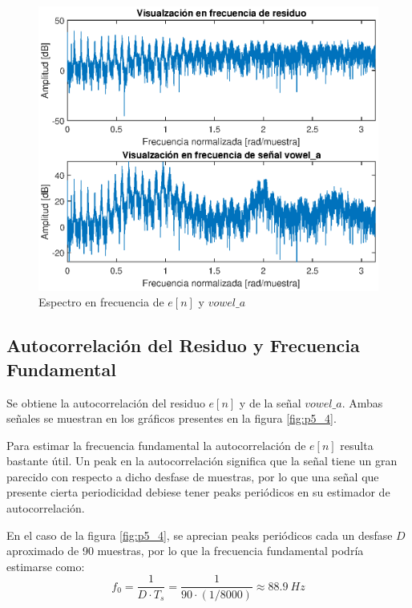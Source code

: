 \begin{figure}[H]
    \centering
    \includegraphics[width = .8\linewidth]{figures/p5_3.eps}
    \caption{Espectro en frecuencia de $e[n]$ y $vowel\_a$}
    \label{fig:p5_3}
\end{figure}

\subsection{Autocorrelación del Residuo y Frecuencia Fundamental}

Se obtiene la autocorrelación del residuo $e[n]$ y de la señal $vowel\_a$. Ambas señales se muestran en los gráficos presentes en la figura \ref{fig:p5_4}.

Para estimar la frecuencia fundamental la autocorrelación de $e[n]$ resulta bastante útil. Un peak en la autocorrelación significa que la señal tiene un gran parecido con respecto a dicho desfase de muestras, por lo que una señal que presente cierta periodicidad debiese tener peaks periódicos en su estimador de autocorrelación.

En el caso de la figura \ref{fig:p5_4}, se aprecian peaks periódicos cada un desfase $D$ aproximado de 90 muestras, por lo que la frecuencia fundamental podría estimarse como:
$$f_0 = \dfrac{1}{D\cdot T_s} =  \dfrac{1}{90\cdot (1/8000)} \approx 88.9~Hz$$

